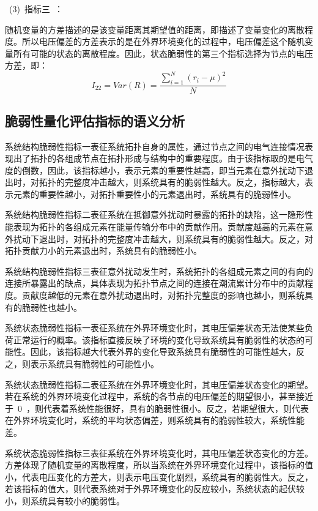~(3)~指标三~：

随机变量的方差描述的是该变量距离其期望值的距离，即描述了变量变化的离散程度。所以电压偏差的方差表示的是在外界环境变化的过程中，电压偏差这个随机变量所有可能的状态的离散程度。因此，状态脆弱性的第三个指标选择为节点的电压方差，即：
\begin{equation}
\label{equ:chap4:Index4}
I_{22}=Var(R)=\displaystyle\frac{\sum_{i=1}^{N}(r_i-\mu)^2}{N}
\end{equation}

\subsection{脆弱性量化评估指标的语义分析}
\label{sec:wordIndex}
系统结构脆弱性指标一表征系统拓扑自身的属性，通过节点之间的电气连接情况表现出了拓扑的各组成节点在拓扑形成与结构中的重要程度。由于该指标取的是电气度的倒数，因此，该指标越小，表示元素的重要性越高，即当元素在意外扰动下退出时，对拓扑的完整度冲击越大，则系统具有的脆弱性越大。反之，指标越大，表示元素的重要性越小，对拓扑重要性小的元素退出时，系统具有的脆弱性小。

系统结构脆弱性指标二表征系统在抵御意外扰动时暴露的拓扑的缺陷，这一隐形性能表现为拓扑的各组成元素在能量传输分布中的贡献作用。贡献度越高的元素在意外扰动下退出时，对拓扑的完整度冲击越大，则系统具有的脆弱性越大。反之，对拓扑贡献力小的元素退出时，系统具有的脆弱性小。

系统结构脆弱性指标三表征意外扰动发生时，系统拓扑的各组成元素之间的有向的连接所暴露出的缺点，具体表现为拓扑节点之间的连接在潮流累计分布中的贡献程度。贡献度越低的元素在意外扰动退出时，对拓扑完整度的影响也越小，则系统具有的脆弱性也越小。

系统状态脆弱性指标一表征系统在外界环境变化时，其电压偏差状态无法使某些负荷正常运行的概率。该指标直接反映了环境的变化导致系统具有脆弱性的状态的可能性。因此，该指标越大代表外界的变化导致系统具有脆弱性的可能性越大，反之，则表示系统具有脆弱性的可能性小。

系统状态脆弱性指标二表征系统在外界环境变化时，其电压偏差状态变化的期望。若在系统的外界环境变化过程中，系统的各节点的电压偏差的期望很小，甚至接近于~$0$~，则代表着系统性能很好，具有的脆弱性很小。反之，若期望很大，则代表在外界环境变化时，系统的平均状态偏差，则系统具有的脆弱性较大，系统性能差。

系统状态脆弱性指标三表征系统在外界环境变化时，其电压偏差状态变化的方差。方差体现了随机变量的离散程度，所以当系统在外界环境变化过程中，该指标的值小，代表电压变化的方差大，则表示电压变化剧烈，系统具有的脆弱性大。反之，若该指标的值大，则代表系统对于外界环境变化的反应较小，系统状态的起伏较小，则系统具有较小的脆弱性。

